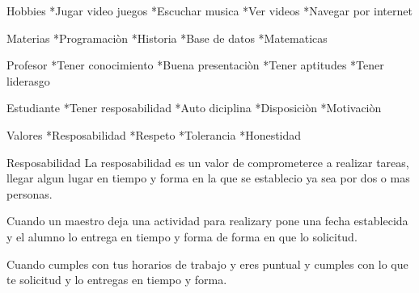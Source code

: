 Hobbies
*Jugar video juegos	
*Escuchar musica
*Ver videos	
*Navegar por internet


Materias
*Programaciòn
*Historia
*Base de datos
*Matematicas


Profesor
*Tener conocimiento
*Buena presentaciòn
*Tener aptitudes
*Tener liderasgo


Estudiante
*Tener resposabilidad
*Auto diciplina
*Disposiciòn
*Motivaciòn


Valores
*Resposabilidad
*Respeto
*Tolerancia
*Honestidad

Resposabilidad
La resposabilidad es un valor de comprometerce a realizar tareas, llegar algun lugar en tiempo y forma en la que se establecio ya sea por dos o mas personas.

Cuando un maestro deja una actividad para realizary pone una fecha establecida
y el alumno lo entrega en tiempo y forma de forma en que lo solicitud.

Cuando cumples con tus horarios de trabajo y eres puntual y cumples con lo que te solicitud y lo entregas en tiempo y forma.
